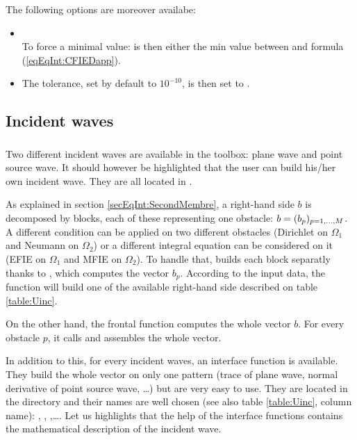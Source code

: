 The following options are moreover availabe:
\begin{itemize}
\item {}\\
To force a minimal value:  is then either the min value between  and formula (\ref{eqEqInt:CFIEDapp}). 
\item{}
The tolerance, set by default to $10^{-10}$, is then set to .
\end{itemize}

\subsection{Incident waves}

\subsubsection{}

Two different incident waves are available in the \mudiff toolbox: plane wave and point source wave. It should however be highlighted that the user can build his/her own incident wave. They are all located in .

As explained in section \ref{secEqInt:SecondMembre}, a right-hand side $b$ is decomposed by blocks, each of these representing one obstacle: $b= (b_p)_{p=1,\ldots,M}$. A different condition can be applied on two different obstacles (\eg Dirichlet on $\Omega_1$ and Neumann on $\Omega_2$) or a different integral equation can be considered on it (\eg EFIE on $\Omega_1$ and MFIE on $\Omega_2$). To handle that, \mudiff builds each block separatly thanks to , which computes the vector $b_p$. According to the input data, the function will build one of the available right-hand side described on table \ref{table:Uinc}.

On the other hand, the frontal function  computes the whole vector $b$. For every obstacle $p$, it calls  and assembles the whole vector. 

In addition to this, for every incident waves, an interface function is available. They build the whole vector on only one pattern (trace of plane wave, normal derivative of point source wave, \ldots) but are very easy to use. They are located in the  directory and their names are well chosen (see also table \ref{table:Uinc}, column \mudiff name): , , ,\ldots. Let us highlights that the help of the interface functions contains the mathematical description of the incident wave.

